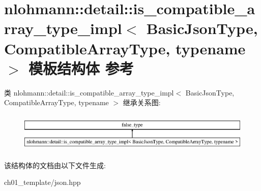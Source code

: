\hypertarget{structnlohmann_1_1detail_1_1is__compatible__array__type__impl}{}\section{nlohmann\+::detail\+::is\+\_\+compatible\+\_\+array\+\_\+type\+\_\+impl$<$ Basic\+Json\+Type, Compatible\+Array\+Type, typename $>$ 模板结构体 参考}
\label{structnlohmann_1_1detail_1_1is__compatible__array__type__impl}
类 nlohmann\+::detail\+::is\+\_\+compatible\+\_\+array\+\_\+type\+\_\+impl$<$ Basic\+Json\+Type, Compatible\+Array\+Type, typename $>$ 继承关系图\+:\begin{figure}[H]
\begin{center}
\leavevmode
\includegraphics[height=1.882353cm]{structnlohmann_1_1detail_1_1is__compatible__array__type__impl}
\end{center}
\end{figure}


该结构体的文档由以下文件生成\+:\begin{DoxyCompactItemize}
\item 
ch01\+\_\+template/json.\+hpp\end{DoxyCompactItemize}
